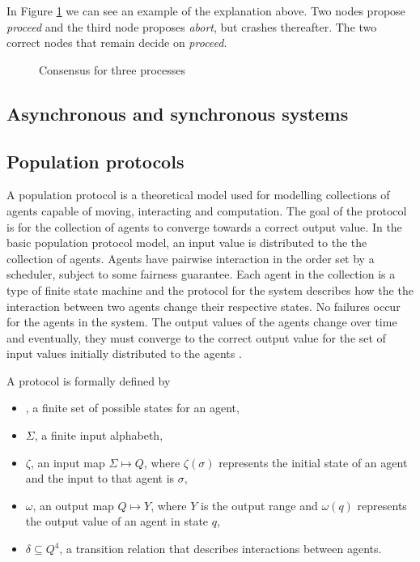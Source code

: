 


In Figure \ref{fig:ConsensusProblem} we can see an example of the explanation above. Two nodes propose \emph{proceed} and the third node proposes \emph{abort}, but crashes thereafter. The two correct nodes that remain decide on \emph{proceed}.
\begin{figure}[H]
    \centering
    
    \caption{Consensus for three processes}
    \label{fig:ConsensusProblem}
\end{figure}



\subsection{Asynchronous and synchronous systems}


\subsection{Population protocols}
 A population protocol is a theoretical model used for modelling collections of agents capable of moving, interacting and computation. The goal of the protocol is for the collection of agents to converge towards a correct output value. In the basic population protocol model, an input value is distributed to the the collection of agents. Agents have pairwise interaction in the order set by a scheduler, subject to some fairness guarantee. Each agent in the collection is a type of finite state machine and the protocol for the system describes how the the interaction between two agents change their respective states. No failures occur for the agents in the system. The output values of the agents change over time and eventually, they must converge to the correct output value for the set of input values initially distributed to the agents \cite{aspnesIntroductionPopulationProtocols2009}. 

 A protocol is formally defined by
 \begin{itemize}
     \item {}, a finite set of possible states for an agent,
     \item $\Sigma$, a finite input alphabeth,
     \item $\zeta$, an input map $\Sigma \mapsto Q$, where $\zeta(\sigma)$ represents the initial state of an agent and the input to that agent is $\sigma$,
     \item $\omega$, an output map $Q \mapsto Y$, where $Y$ is the output range and $\omega(q)$ represents the output value of an agent in state $q$,
     \item $\delta \subseteq Q^4$, a transition relation that describes interactions between agents.
     
 \end{itemize}


